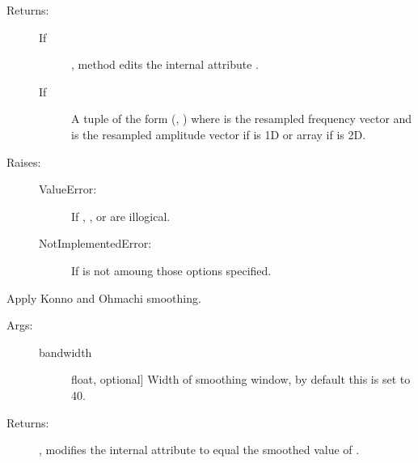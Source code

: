 \documentclass[letterpaper,10pt,english,openany,oneside]{sphinxmanual}
\begin{document}
\begin{fulllineitems}
\begin{fulllineitems}
\begin{description}
\begin{description}
\end{description}

\item[{Returns:}] \leavevmode\begin{description}
\item[{If }] \leavevmode
{}, method edits the internal attribute .

\item[{If }] \leavevmode
A tuple of the form (, )
where  is the resampled frequency vector and 
 is the resampled amplitude vector if 
 is 1D or array if  is 2D.

\end{description}

\item[{Raises:}] \leavevmode\begin{description}
\item[{ValueError:}] \leavevmode
If , , or  are illogical.

\item[{NotImplementedError:}] \leavevmode
If  is not amoung those options specified.

\end{description}

\end{description}

\end{fulllineitems}


\begin{fulllineitems}
\label{\detokenize{index:sigpropy.FourierTransform.smooth_konno_ohmachi}}
Apply Konno and Ohmachi smoothing.
\begin{description}
\item[{Args:}] \leavevmode\begin{description}
\item[{bandwidth}] \leavevmode{[}float, optional{]}
Width of smoothing window, by default this is set to 40.

\end{description}

\item[{Returns:}] \leavevmode
{}, modifies the internal attribute  to equal the
smoothed value of .

\end{description}

\end{fulllineitems}


\end{fulllineitems}




\renewcommand{\indexname}{Index}
\printindex
\end{document}
